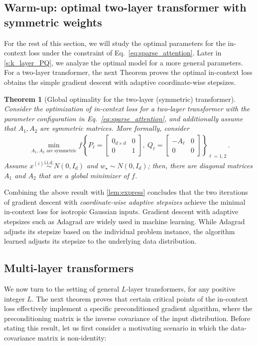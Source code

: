 \documentclass{article}
\newtheorem{theorem}{Theorem}
\newcommand{\wstar}{w_\star}
\newcommand{\tx}[1]{x^{(#1)}}
\begin{document}
\subsection{Warm-up: optimal two-layer transformer with symmetric weights}
\label{s:two_layer}

 For the rest of this section, we will study the optimal parameters for the in-context loss under the constraint of Eq.~\eqref{eq:sparse_attention}. Later in \autoref{s:k_layer_PQ}, we analyze the optimal model for a more general parameters.
For a two-layer transformer, the next Theorem proves the optimal in-context loss obtains the simple gradient descent with adaptive coordinate-wise stepsizes. 

\begin{theorem}[Global optimality for the two-layer (symmetric) transformer]
\label{t:two_layer}
Consider the optimization of in-context loss for a two-layer transformer with the parameter configuration in Eq.~\eqref{eq:sparse_attention}, and additionally assume that $A_1,A_2$ are symmetric matrices. 
More formally, consider
\begin{align}
\min_{A_1,A_2 \text{ are symmetric}} f  \left\{  P_\ell = \begin{bmatrix}
0_{d\times d} & 0 \\ 
0 & 1 
\end{bmatrix},~Q_\ell = \begin{bmatrix}
-A_\ell & 0 \\ 
0 & 0
\end{bmatrix}\right\}_{\ell=1,2}\,.
\end{align}
Assume $\tx{i} \stackrel{\text{i.i.d.}}{\sim}N(0,I_d)$  and $\wstar \sim N(0,I_d)$; then, there are diagonal matrices $A_1$ and $A_2$ that are a global minimizer of $f$.
\end{theorem} 
Combining the above result with \autoref{lem:express} concludes that the two iterations of gradient descent with \emph{coordinate-wise adaptive stepsizes} achieve the minimal in-context loss for isotropic Gaussian inputs. Gradient descent with adaptive stepsizes such as Adagrad \citep{duchi2011adaptive} are widely used in machine learning. While Adagrad adjusts its stepsize based on the individual problem instance, the algorithm learned adjusts its stepsize to the underlying data distribution. 

\subsection{Multi-layer transformers}
\label{s:L_layer_P_0}
We now turn to the setting of general $L$-layer transformers, for any positive integer $L$. The next theorem proves that certain critical points of the in-context loss effectively implement a specific preconditioned gradient algorithm, where the preconditioning matrix is the inverse covariance of the input distribution. Before stating this result, let us first consider a motivating scenario in which the data-covariance matrix is non-identity:
\end{document}
